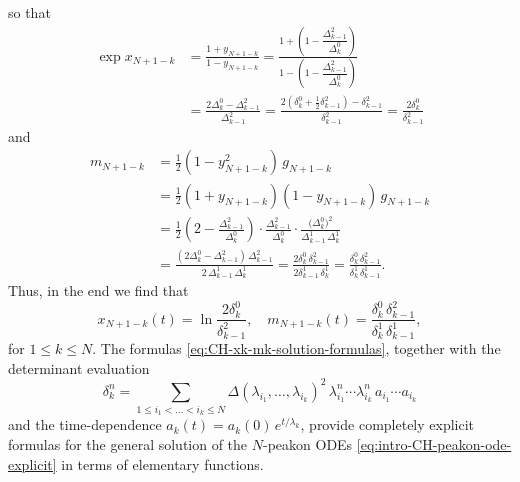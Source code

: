 \documentclass[10pt,a4paper]{article} \pdfoutput=1 
\begin{document}
so that
\begin{equation*}
  \begin{split}
    \exp x_{N+1-k}
    &
    = \frac{1 + y_{N+1-k}}{1 - y_{N+1-k}}
    = \frac{1 + \left( 1 - \dfrac{\Delta_{k-1}^2}{\Delta_{k}^0} \right)}{1 - \left( 1 - \dfrac{\Delta_{k-1}^2}{\Delta_{k}^0} \right)}
    \\ &
    = \frac{2 \Delta_{k}^0 - \Delta_{k-1}^2}{\Delta_{k-1}^2}
    = \frac{2 ( \delta_k^0 + \tfrac12 \delta_{k-1}^2 ) - \delta_{k-1}^2}{\delta_{k-1}^2}
    = \frac{2 \delta_k^0}{\delta_{k-1}^2}
  \end{split}
\end{equation*}
and
\begin{equation*}
  \begin{split}
    m_{N+1-k}
    &
    = \tfrac12 (1 - y_{N+1-k}^2) \, g_{N+1-k}
    \\ &
    = \tfrac12 (1 + y_{N+1-k}) (1 - y_{N+1-k}) \, g_{N+1-k}
    \\ &
    = \frac12 \left( 2 - \frac{\Delta_{k-1}^2}{\Delta_{k}^0} \right)
    \cdot
    \frac{\Delta_{k-1}^2}{\Delta_{k}^0}
    \cdot
    \frac{\bigl( \Delta_{k}^0 \bigr)^2}{\Delta_{k-1}^1 \, \Delta_{k}^1}
    \\ &
    = \frac{(2 \Delta_{k}^0 - \Delta_{k-1}^2) \, \Delta_{k-1}^2}{2 \, \Delta_{k-1}^1 \, \Delta_{k}^1}
    = \frac{2 \delta_k^0 \, \delta_{k-1}^2}{2 \delta_{k-1}^1 \, \delta_{k}^1}
    = \frac{\delta_k^0 \, \delta_{k-1}^2}{\delta_k^1 \, \delta_{k-1}^1}
    .
  \end{split}
\end{equation*}
Thus, in the end we find that
\begin{equation}
  \label{eq:CH-xk-mk-solution-formulas}
  x_{N+1-k}(t) = \ln\frac{2 \delta_k^0}{\delta_{k-1}^2}
  , \quad
  m_{N+1-k}(t) = \frac{\delta_k^0 \, \delta_{k-1}^2}{\delta_k^1 \, \delta_{k-1}^1}
  ,
\end{equation}
for $1 \le k \le N$.
The formulas \eqref{eq:CH-xk-mk-solution-formulas},
together with the determinant evaluation
\begin{equation}
  \label{eq:CH-delta-k-heine-again}
  \delta_k^n =
  \sum_{1 \le i_1 < \dots < i_k \le N} \Delta(\lambda_{i_1},\dots,\lambda_{i_k})^2 \, \lambda_{i_1}^n \dotsm \lambda_{i_k}^n \, a_{i_1} \dotsm a_{i_k}
\end{equation}
and the time-dependence $a_k(t) = a_k(0) \, e^{t/\lambda_k}$,
provide completely explicit formulas for the general solution of the $N$-peakon ODEs
\eqref{eq:intro-CH-peakon-ode-explicit}
in terms of elementary functions.
\end{document}
